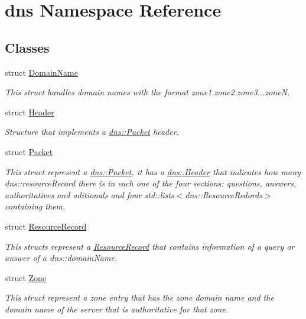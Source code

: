 \hypertarget{namespacedns}{}\section{dns Namespace Reference}
\label{namespacedns}
\subsection*{Classes}
\begin{DoxyCompactItemize}
\item 
struct \hyperlink{structdns_1_1DomainName}{Domain\+Name}
\begin{DoxyCompactList}\small\item\em This struct handles domain names with the format \textquotesingle{}zone1.\+zone2.\+zone3...zoneN\textquotesingle{}. \end{DoxyCompactList}\item 
struct \hyperlink{structdns_1_1Header}{Header}
\begin{DoxyCompactList}\small\item\em Structure that implements a \hyperlink{structdns_1_1Packet}{dns\+::\+Packet} header. \end{DoxyCompactList}\item 
struct \hyperlink{structdns_1_1Packet}{Packet}
\begin{DoxyCompactList}\small\item\em This struct represent a \hyperlink{structdns_1_1Packet}{dns\+::\+Packet}, it has a \hyperlink{structdns_1_1Header}{dns\+::\+Header} that indicates how many dns\+::resource\+Record there is in each one of the four sections\+: questions, answers, authoritatives and aditionals and four std\+::lists$<$dns\+::\+Resource\+Redords$>$ containing them. \end{DoxyCompactList}\item 
struct \hyperlink{structdns_1_1ResourceRecord}{Resource\+Record}
\begin{DoxyCompactList}\small\item\em This structs represent a \hyperlink{structdns_1_1ResourceRecord}{Resource\+Record} that contains information of a query or answer of a dns\+::domain\+Name. \end{DoxyCompactList}\item 
struct \hyperlink{structdns_1_1Zone}{Zone}
\begin{DoxyCompactList}\small\item\em This struct represent a zone entry that has the zone domain name and the domain name of the server that is authoritative for that zone. \end{DoxyCompactList}\end{DoxyCompactItemize}
